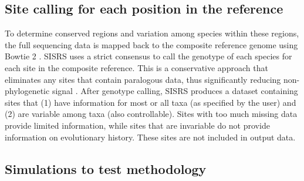 \documentclass[11pt, oneside]{article}   	%
\begin{document}
\subsection{Site calling for each position in the reference}
To determine conserved regions and variation among species within these regions, the full sequencing data is mapped back to the composite reference genome using Bowtie 2 \citep{Langmead2012}.
SISRS uses a strict consensus to call the genotype of each species for each site in the composite reference.
This is a conservative approach that eliminates any sites that contain paralogous data, thus significantly reducing non-phylogenetic signal \citep{Philippe2011}. 
After genotype calling, SISRS produces a dataset containing sites that (1) have information for most or all taxa (as specified by the user) and (2) are variable among taxa (also controllable). 
Sites with too much missing data provide limited information, while sites that are invariable do not provide information on evolutionary history.
These sites are not included in output data.


\subsection{Simulations to test methodology}
\end{document}
